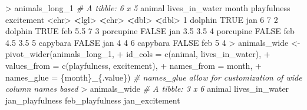 \documentclass[
]{book}
\newenvironment{Shaded}{\begin{snugshade}}{\end{snugshade}}
\newcommand{\AttributeTok}[1]{\textcolor[rgb]{0.77,0.63,0.00}{#1}}
\newcommand{\CommentTok}[1]{\textcolor[rgb]{0.56,0.35,0.01}{\textit{#1}}}
\newcommand{\ConstantTok}[1]{\textcolor[rgb]{0.00,0.00,0.00}{#1}}
\newcommand{\DecValTok}[1]{\textcolor[rgb]{0.00,0.00,0.81}{#1}}
\newcommand{\ErrorTok}[1]{\textcolor[rgb]{0.64,0.00,0.00}{\textbf{#1}}}
\newcommand{\FloatTok}[1]{\textcolor[rgb]{0.00,0.00,0.81}{#1}}
\newcommand{\FunctionTok}[1]{\textcolor[rgb]{0.00,0.00,0.00}{#1}}
\newcommand{\NormalTok}[1]{#1}
\newcommand{\OtherTok}[1]{\textcolor[rgb]{0.56,0.35,0.01}{#1}}
\newcommand{\SpecialCharTok}[1]{\textcolor[rgb]{0.00,0.00,0.00}{#1}}
\newcommand{\StringTok}[1]{\textcolor[rgb]{0.31,0.60,0.02}{#1}}
\begin{document}
\begin{Shaded}
\begin{Highlighting}[]
\SpecialCharTok{\textgreater{}}\NormalTok{ animals\_long\_1}
\CommentTok{\# A tibble: 6 x 5}
\NormalTok{  animal    lives\_in\_water month playfulness excitement}
  \SpecialCharTok{\textless{}}\NormalTok{chr}\SpecialCharTok{\textgreater{}}     \ErrorTok{\textless{}}\NormalTok{lgl}\SpecialCharTok{\textgreater{}}          \ErrorTok{\textless{}}\NormalTok{chr}\SpecialCharTok{\textgreater{}}       \ErrorTok{\textless{}}\NormalTok{dbl}\SpecialCharTok{\textgreater{}}      \ErrorTok{\textless{}}\NormalTok{dbl}\SpecialCharTok{\textgreater{}}
\DecValTok{1}\NormalTok{ dolphin   }\ConstantTok{TRUE}\NormalTok{           jan           }\DecValTok{6}          \DecValTok{7}  
\DecValTok{2}\NormalTok{ dolphin   }\ConstantTok{TRUE}\NormalTok{           feb           }\FloatTok{5.5}        \DecValTok{7}  
\DecValTok{3}\NormalTok{ porcupine }\ConstantTok{FALSE}\NormalTok{          jan           }\FloatTok{3.5}        \FloatTok{3.5}
\DecValTok{4}\NormalTok{ porcupine }\ConstantTok{FALSE}\NormalTok{          feb           }\FloatTok{4.5}        \FloatTok{3.5}
\DecValTok{5}\NormalTok{ capybara  }\ConstantTok{FALSE}\NormalTok{          jan           }\DecValTok{4}          \DecValTok{4}  
\DecValTok{6}\NormalTok{ capybara  }\ConstantTok{FALSE}\NormalTok{          feb           }\DecValTok{5}          \DecValTok{4}  
\SpecialCharTok{\textgreater{}}\NormalTok{ animals\_wide }\OtherTok{\textless{}{-}} \FunctionTok{pivot\_wider}\NormalTok{(animals\_long\_1,}
\SpecialCharTok{+}                             \AttributeTok{id\_cols =} \FunctionTok{c}\NormalTok{(}\StringTok{\textquotesingle{}animal\textquotesingle{}}\NormalTok{, }\StringTok{\textquotesingle{}lives\_in\_water\textquotesingle{}}\NormalTok{),}
\SpecialCharTok{+}                             \AttributeTok{values\_from =} \FunctionTok{c}\NormalTok{(}\StringTok{\textquotesingle{}playfulness\textquotesingle{}}\NormalTok{, }\StringTok{\textquotesingle{}excitement\textquotesingle{}}\NormalTok{),}
\SpecialCharTok{+}                             \AttributeTok{names\_from =} \StringTok{\textquotesingle{}month\textquotesingle{}}\NormalTok{,}
\SpecialCharTok{+}                             \AttributeTok{names\_glue =} \StringTok{\textquotesingle{}\{month\}\_\{.value\}\textquotesingle{}}\NormalTok{) }\CommentTok{\# \textasciigrave{}names\_glue\textasciigrave{} allow for customization of wide column names based}
\SpecialCharTok{\textgreater{}}\NormalTok{ animals\_wide}
\CommentTok{\# A tibble: 3 x 6}
\NormalTok{  animal    lives\_in\_water jan\_playfulness feb\_playfulness jan\_excitement}

\end{Highlighting}
\end{Shaded}
\end{document}
